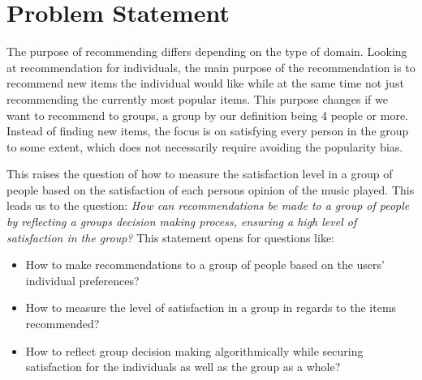 	\section{Problem Statement}
The purpose of recommending differs depending on the type of domain. Looking at recommendation for individuals, the main purpose of the recommendation is to recommend new items the individual would like while at the same time not just recommending the currently most popular items. This purpose changes if we want to recommend to groups, a group by our definition being 4 people or more. Instead of finding new items, the focus is on satisfying every person in the group to some extent, which does not necessarily require avoiding the popularity bias. 

This raises the question of how to measure the satisfaction level in a group of people based on the satisfaction of each persons opinion of the music played. This leads us to the question:
\textit{How can recommendations be made to a group of people by reflecting a groups decision making process, ensuring a high level of satisfaction in the group?} This statement opens for questions like:
\begin{itemize}
\item How to make recommendations to a group of people based on the users' individual preferences?
\item How to measure the level of satisfaction in a group in regards to the items recommended?
\item How to reflect group decision making algorithmically while securing satisfaction for the individuals as well as the group as a whole?
\end{itemize}
\newpage